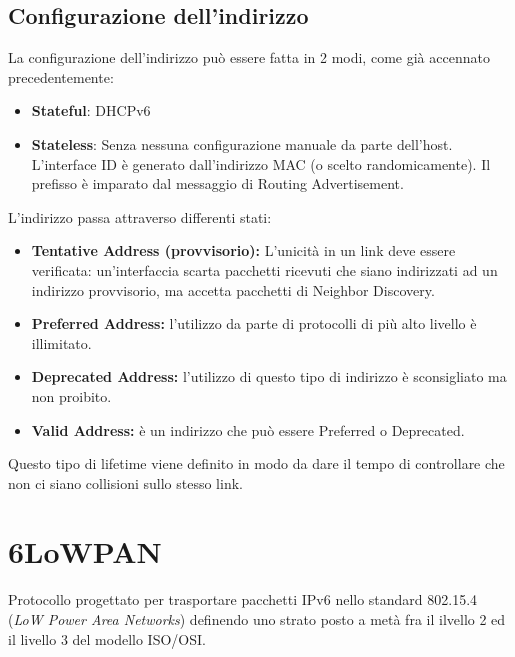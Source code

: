 \documentclass{article}
\begin{document}
\subsection{Configurazione dell'indirizzo}
La configurazione dell'indirizzo può essere fatta in 2 modi, come già accennato precedentemente:
\begin{itemize}
    \item \textbf{Stateful}: DHCPv6
    \item \textbf{Stateless}: Senza nessuna configurazione manuale da parte dell'host. \\ L'interface ID è generato dall'indirizzo MAC (o scelto randomicamente). Il prefisso è imparato dal messaggio di Routing Advertisement.
\end{itemize}
L'indirizzo passa attraverso differenti stati:
\begin{itemize}
    \item \textbf{Tentative Address (provvisorio):} L'unicità in un link deve essere verificata: un'interfaccia scarta pacchetti ricevuti che siano indirizzati ad un indirizzo provvisorio, ma accetta pacchetti di Neighbor Discovery.
    \item \textbf{Preferred Address:} l'utilizzo da parte di protocolli di più alto livello è illimitato.
    \item \textbf{Deprecated Address:} l'utilizzo di questo tipo di indirizzo è sconsigliato ma non proibito.
    \item \textbf{Valid Address:} è un indirizzo che può essere Preferred o Deprecated.
\end{itemize}
Questo tipo di lifetime viene definito in modo da dare il tempo di controllare che non ci siano collisioni sullo stesso link.

\newpage
\section{6LoWPAN}
Protocollo progettato per trasportare pacchetti IPv6 nello standard 802.15.4 (\textit{LoW Power Area Networks}) definendo uno strato posto a metà fra il ilvello 2 ed il livello 3 del modello ISO/OSI.
\end{document}
